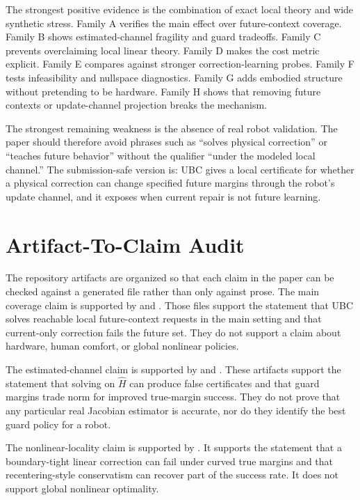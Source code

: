 \documentclass{article}
\begin{document}
The strongest positive evidence is the combination of exact local theory and
wide synthetic stress. Family A verifies the main effect over future-context
coverage. Family B shows estimated-channel fragility and guard tradeoffs. Family
C prevents overclaiming local linear theory. Family D makes the cost metric
explicit. Family E compares against stronger correction-learning probes. Family
F tests infeasibility and nullspace diagnostics. Family G adds embodied
structure without pretending to be hardware. Family H shows that removing future
contexts or update-channel projection breaks the mechanism.

The strongest remaining weakness is the absence of real robot validation. The
paper should therefore avoid phrases such as ``solves physical correction'' or
``teaches future behavior'' without the qualifier ``under the modeled local
channel.'' The submission-safe version is: UBC gives a local certificate for
whether a physical correction can change specified future margins through the
robot's update channel, and it exposes when current repair is not future
learning.

\section{Artifact-To-Claim Audit}

The repository artifacts are organized so that each claim in the paper can be
checked against a generated file rather than only against prose. The main
coverage claim is supported by
 and
. Those files support
the statement that UBC solves reachable local future-context requests in the
main setting and that current-only correction fails the future set. They do not
support a claim about hardware, human comfort, or global nonlinear policies.

The estimated-channel claim is supported by
 and
. These artifacts support the
statement that solving on $\hat H$ can produce false certificates and that guard
margins trade norm for improved true-margin success. They do not prove that any
particular real Jacobian estimator is accurate, nor do they identify the best
guard policy for a robot.

The nonlinear-locality claim is supported by
. It supports the statement
that a boundary-tight linear correction can fail under curved true margins and
that recentering-style conservatism can recover part of the success rate. It
does not support global nonlinear optimality.
\end{document}
